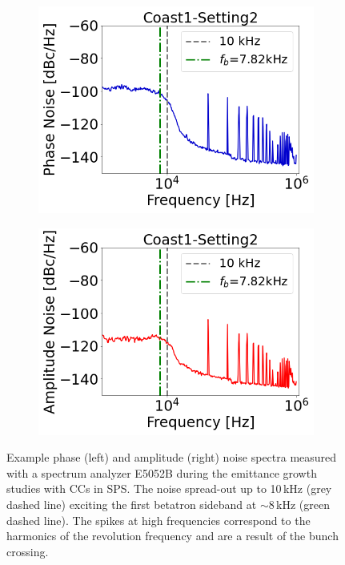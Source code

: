  \begin{figure}[!ht]
    \centering
    \begin{subfigure}[t]{0.45\textwidth}
        \centering
        \includegraphics[width=1\textwidth]{images/Ch5/Measured_spectrum_MD5_Coast1-Setting2-PN.csv_no_psd.png}
    \end{subfigure}
    \hfill
    \begin{subfigure}[t]{0.45\textwidth}
        \centering
        \includegraphics[width=1\textwidth]{images/Ch5/Measured_spectrum_MD5_Coast1-Setting2-AN.csv_no_psd.png}
    \end{subfigure}
    \hfill
     \caption{Example phase (left) and amplitude (right) noise spectra measured with a spectrum analyzer E5052B during the emittance growth studies with CCs in SPS. The noise spread-out up to 10\,kHz (grey dashed line) exciting the first betatron sideband at $\sim$8\,kHz (green dashed line). The spikes at high frequencies correspond to the harmonics of the revolution frequency and are a result of the bunch crossing.} %
     \label{fig:example_PN_and_AN}
\end{figure}




